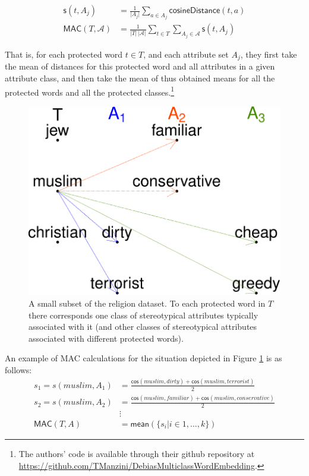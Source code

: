 \documentclass{clv3}
\begin{document}
\begin{align*}
\mathsf{s}(t, A_j) & = \frac{1}{\vert A_j\vert}\sum_{a\in A_j}\mathsf{cosineDistance}(t,a) \\
\mathsf{MAC}(T,\mathcal{A}) & = \frac{1}{\vert T \vert \,\vert \mathcal{A}\vert}\sum_{t \in T }\sum_{A_j \in \mathcal{A}}    \mathsf{s}(t,A_j)
\end{align*}

\noindent That is, for each protected word \(t\in T\), and each
attribute set \(A_j\), they first take the mean of distances for this
protected word and all attributes in a given attribute class, and then
take the mean of thus obtained means for all the protected words and all
the protected classes.\footnote{The authors' code is available through
  their github repository at
  \url{https://github.com/TManzini/DebiasMulticlassWordEmbedding}.}

\begin{figure}

\begin{center}\includegraphics[width=0.5\linewidth]{figures/MACexample} \end{center}
\caption{A small subset of the religion dataset.  To each protected word in $T$  there corresponds one class of stereotypical attributes typically associated with it (and other classes of stereotypical attributes associated with different protected words).}
\label{fig:MACexample}
\end{figure}

\noindent An example of \textsf{MAC} calculations for the situation
depicted in Figure \ref{fig:MACexample} is as follows: \begin{align*}
s_1   = s(muslim,A_1)  & = \frac{\mathsf{cos}(muslim,dirty)+\mathsf{cos}(muslim,terrorist)}{2} \\ 
s_2   = s(muslim,A_2)  & = \frac{\mathsf{cos}(muslim,familiar)+\mathsf{cos}(muslim,conservative)}{2}\\ & \vdots \\ 
\mathsf{MAC}(T,A)  & = \mathsf{mean}(\{s_i \vert i \in 1, \dots, k\})
\end{align*}
\end{document}
